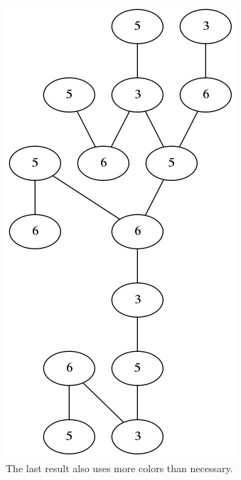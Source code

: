 \documentclass[11pt]{article}
\begin{document}
\begin{figure}[!htb]
\centering
\includegraphics[scale=0.5]{c.png}
\caption{The last result also uses more colors than necessary.}
\end{figure}

%
\end{document}
